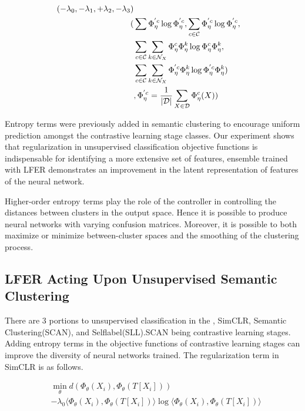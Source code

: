 \documentclass[journal]{journal}
\begin{document}
\begin{equation}
\begin{aligned}
(-\lambda_{0}, -\lambda_{1}, +\lambda_{2}, -\lambda_{3}) \\ (& \sum  \Phi_{\eta}^{'c} \log \Phi_{\eta}^{'c}, \sum_{c \in \mathcal{C}}  \Phi_{\eta}^{'c} \log  \Phi_{\eta}^{'c}, \\ & \sum_{c \in \mathcal{C}} \sum_{k \in \mathcal{N}_X} \Phi_{\eta}^{c} \Phi_{\eta}^{k} \log  \Phi_{\eta}^{c}\Phi_{\eta}^{k},  \\  &\sum_{c \in \mathcal{C}}  \sum_{k \in \mathcal{N}_X} \Phi_{\eta}^{'c} \Phi_{\eta}^{k} \log  \Phi_{\eta}^{'c} \Phi_{\eta}^{k} ) \\ & , \space \Phi_{\eta}^{'c} = \frac{1}{|\mathcal{D}|} \sum_{X \in \mathcal{D}}  \Phi_{\eta}^{c} (X))
\end{aligned}
\end{equation}

Entropy terms were previously added in semantic clustering to encourage uniform prediction amongst the contrastive learning stage classes. Our experiment shows that regularization in unsupervised classification objective functions is indispensable for identifying a more extensive set of features, ensemble trained with LFER demonstrates an improvement in the latent representation of features of the neural network.

 Higher-order entropy terms play the role of the controller in controlling the distances between clusters in the output space. Hence it is possible to produce neural networks with varying confusion matrices. Moreover, it is possible to both maximize or minimize between-cluster spaces and the smoothing of the clustering process. 

\subsection{LFER Acting Upon Unsupervised Semantic Clustering}

There are 3 portions to unsupervised classification in the \cite{wvangansbeke2020scan}, SimCLR, Semantic Clustering(SCAN), and Selflabel(SLL).SCAN being contrastive learning stages. Adding entropy terms in the objective functions of contrastive learning stages can improve the diversity of neural networks trained. The regularization term in SimCLR is as follows.

\begin{equation}
\begin{aligned}
& \min_{\theta}d(\Phi_{\theta}(X_i), \Phi_{\theta}(T[X_i])) \\
& - \lambda_{0} \langle \Phi_{\theta}(X_i), \Phi_{\theta}(T[X_i]) \rangle \log \langle \Phi_{\theta}(X_i), \Phi_{\theta}(T[X_i]) \rangle
\end{aligned}
\end{equation}
\end{document}
